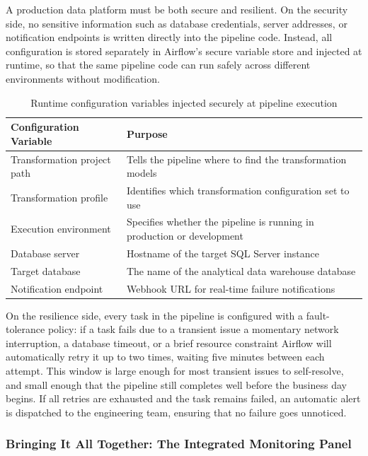 A production data platform must be both secure and resilient. On the security side,
no sensitive information such as database credentials, server addresses, or
notification endpoints is written directly into the pipeline code. Instead, all
configuration is stored separately in Airflow's secure variable store and injected
at runtime, so that the same pipeline code can run safely across different environments
without modification.

\begin{table}[H]
\centering
\small
\renewcommand{\arraystretch}{1.3}
\caption{Runtime configuration variables injected securely at pipeline execution}
\label{tab:airflow_vars}
\begin{tabular}{|p{4.5cm}|p{9cm}|}
\hline
\rowcolor{blue!15}
\textbf{Configuration Variable} & \textbf{Purpose} \\
\hline
Transformation project path & Tells the pipeline where to find the transformation models \\
\hline
Transformation profile & Identifies which transformation configuration set to use \\
\hline
Execution environment & Specifies whether the pipeline is running in production or development \\
\hline
Database server & Hostname of the target SQL Server instance \\
\hline
Target database & The name of the analytical data warehouse database \\
\hline
Notification endpoint & Webhook URL for real-time failure notifications \\
\hline
\end{tabular}
\end{table}

On the resilience side, every task in the pipeline is configured with a fault-tolerance
policy: if a task fails due to a transient issue a momentary network interruption,
a database timeout, or a brief resource constraint  Airflow will automatically retry
it up to two times, waiting five minutes between each attempt. This window is large
enough for most transient issues to self-resolve, and small enough that the pipeline
still completes well before the business day begins. If all retries are exhausted and
the task remains failed, an automatic alert is dispatched to the engineering team,
ensuring that no failure goes unnoticed.

\subsubsection{Bringing It All Together: The Integrated Monitoring Panel}

